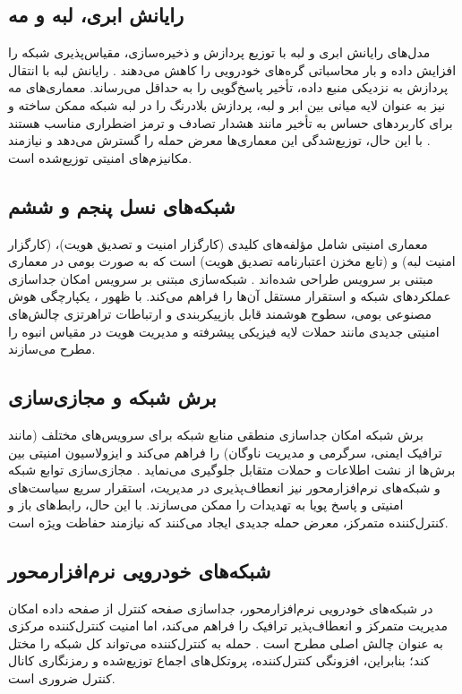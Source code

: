 \documentclass[12pt,a4paper]{article}
\begin{document}
\subsection{رایانش ابری، لبه و مه}
مدل‌های رایانش ابری و لبه با توزیع پردازش و ذخیره‌سازی، مقیاس‌پذیری شبکه را افزایش داده و بار محاسباتی گره‌های خودرویی را کاهش می‌دهند \cite{xuInternetVehiclesBig2018}. رایانش لبه با انتقال پردازش به نزدیکی منبع داده، تأخیر پاسخ‌گویی را به حداقل می‌رساند. معماری‌های مه نیز به عنوان لایه میانی بین ابر و لبه، پردازش بلادرنگ را در لبه شبکه ممکن ساخته و برای کاربردهای حساس به تأخیر مانند هشدار تصادف و ترمز اضطراری مناسب هستند \cite{niSecuringFogComputing2018}. با این حال، توزیع‌شدگی این معماری‌ها معرض حمله را گسترش می‌دهد و نیازمند مکانیزم‌های امنیتی توزیع‌شده است.

\subsection{شبکه‌های نسل پنجم و ششم}
معماری امنیتی  شامل مؤلفه‌های کلیدی  (کارگزار امنیت و تصدیق هویت)،  (کارگزار امنیت لبه) و  (تابع مخزن اعتبارنامه تصدیق هویت) است که به صورت بومی در معماری مبتنی بر سرویس طراحی شده‌اند \cite{farsimadanReviewSecurityChallenges2025}. شبکه‌سازی مبتنی بر سرویس امکان جداسازی عملکردهای شبکه و استقرار مستقل آن‌ها را فراهم می‌کند. با ظهور ، یکپارچگی هوش مصنوعی بومی، سطوح هوشمند قابل بازپیکربندی و ارتباطات تراهرتزی چالش‌های امنیتی جدیدی مانند حملات لایه فیزیکی پیشرفته و مدیریت هویت در مقیاس انبوه را مطرح می‌سازند.

\subsection{برش شبکه و مجازی‌سازی}
برش شبکه امکان جداسازی منطقی منابع شبکه برای سرویس‌های مختلف (مانند ترافیک ایمنی، سرگرمی و مدیریت ناوگان) را فراهم می‌کند و ایزولاسیون امنیتی بین برش‌ها از نشت اطلاعات و حملات متقابل جلوگیری می‌نماید \cite{farsimadanReviewSecurityChallenges2025}. مجازی‌سازی توابع شبکه و شبکه‌های نرم‌افزارمحور نیز انعطاف‌پذیری در مدیریت، استقرار سریع سیاست‌های امنیتی و پاسخ پویا به تهدیدات را ممکن می‌سازند. با این حال، رابط‌های باز و کنترل‌کننده متمرکز، معرض حمله جدیدی ایجاد می‌کنند که نیازمند حفاظت ویژه است.

\subsection{شبکه‌های خودرویی نرم‌افزارمحور}
در شبکه‌های خودرویی نرم‌افزارمحور، جداسازی صفحه کنترل از صفحه داده امکان مدیریت متمرکز و انعطاف‌پذیر ترافیک را فراهم می‌کند، اما امنیت کنترل‌کننده مرکزی به عنوان چالش اصلی مطرح است \cite{rahmawatiagustinaSystematicLiteratureReview2025}. حمله به کنترل‌کننده می‌تواند کل شبکه را مختل کند؛ بنابراین، افزونگی کنترل‌کننده، پروتکل‌های اجماع توزیع‌شده و رمزنگاری کانال کنترل ضروری است.
\end{document}
